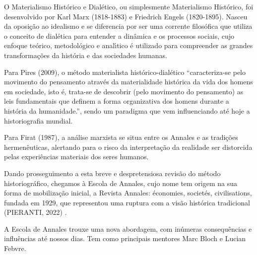 \documentclass[
12pt,		%
openright,	%
twoside,  %
a4paper,			%
chapter=TITLE,		%
english,			%
french,				%
spanish,			%
brazil				%
]{USPSC-classe/USPSC}
\begin{document}
O Materialismo Hist\'orico e Dial\'etico, ou simplesmente Materialismo Hist\'orico, foi desenvolvido  por Karl Marx (1818-1883) e Friedrich Engels (1820-1895). Nasceu da oposi\c{c}\~ao ao idealismo e se diferencia por ser uma corrente filos\'ofica que utiliza o conceito de dial\'etica para entender a din\^amica e os processos sociais, cujo enfoque te\'orico, metodol\'ogico e anal\'{\i}tico \'e utilizado para compreender as grandes transforma\c{c}\~oes da hist\'oria e das sociedades humanas.










Para  Pires (2009), o m\'etodo materialista hist\'orico-dial\'etico “caracteriza-se pelo movimento do pensamento atrav\'es da materialidade hist\'orica da vida dos homens em sociedade, isto \'e, trata-se de descobrir (pelo movimento do pensamento) as leis fundamentais que definem a forma organizativa dos homens durante a hist\'oria da humanidade.”, sendo um paradigma que vem influenciando at\'e hoje a historiografia mundial.










Para Firat (1987), \textquotedbl a an\'alise marxista se situa entre os Annales e as tradi\c{c}\~oes hermen\^euticas\textquotedbl , alertando para o risco da interpreta\c{c}\~ao da realidade ser distorcida pelas \textquotedbl experi\^encias materiais dos seres humanos\textquotedbl .










Dando prosseguimento a esta breve e despretensiosa revis\~ao do m\'etodo historiogr\'afico, chegamos \`a Escola de Annales, cujo nome tem origem na sua forma de mobiliza\c{c}\~ao inicial, a Revista Annales: \'economies, societ\'es, civilisations, fundada em 1929, que representou uma ruptura com a vis\~ao hist\'orica tradicional (PIERANTI, 2022) .










A Escola de Annales trouxe uma nova abordagem, com in\'umeras consequ\^encias e influ\^encias at\'e nossos dias. Tem como principais mentores  Marc Bloch e Lucian Febvre.
\end{document}
